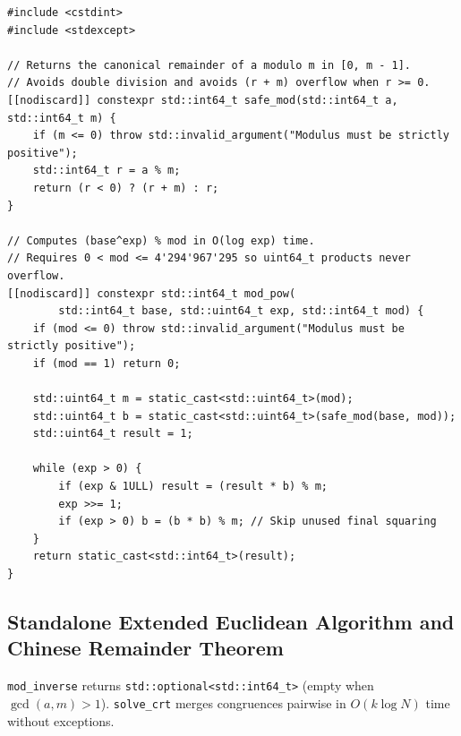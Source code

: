\documentclass[11pt,a4paper]{article}
\theoremstyle{definition}
\begin{document}
\begin{lstlisting}[caption={Safe Canonical Modulo and Standalone O(log exp) Binary Exponentiation}]
#include <cstdint>
#include <stdexcept>

// Returns the canonical remainder of a modulo m in [0, m - 1].
// Avoids double division and avoids (r + m) overflow when r >= 0.
[[nodiscard]] constexpr std::int64_t safe_mod(std::int64_t a, std::int64_t m) {
    if (m <= 0) throw std::invalid_argument("Modulus must be strictly positive");
    std::int64_t r = a % m;
    return (r < 0) ? (r + m) : r;
}

// Computes (base^exp) % mod in O(log exp) time.
// Requires 0 < mod <= 4'294'967'295 so uint64_t products never overflow.
[[nodiscard]] constexpr std::int64_t mod_pow(
        std::int64_t base, std::uint64_t exp, std::int64_t mod) {
    if (mod <= 0) throw std::invalid_argument("Modulus must be strictly positive");
    if (mod == 1) return 0;

    std::uint64_t m = static_cast<std::uint64_t>(mod);
    std::uint64_t b = static_cast<std::uint64_t>(safe_mod(base, mod));
    std::uint64_t result = 1;

    while (exp > 0) {
        if (exp & 1ULL) result = (result * b) % m;
        exp >>= 1;
        if (exp > 0) b = (b * b) % m; // Skip unused final squaring
    }
    return static_cast<std::int64_t>(result);
}
\end{lstlisting}

\subsection{Standalone Extended Euclidean Algorithm and Chinese Remainder Theorem}

\texttt{mod\_inverse} returns \texttt{std::optional<std::int64\_t>} (empty when $\gcd(a, m) > 1$). \texttt{solve\_crt} merges congruences pairwise in $O(k \log N)$ time without exceptions.
\end{document}
